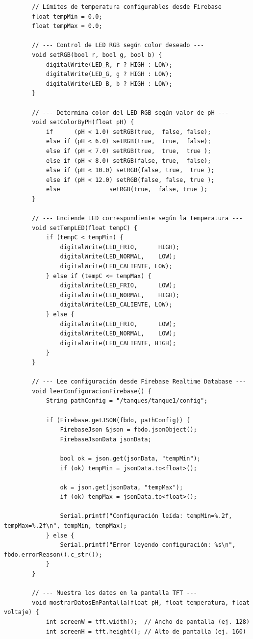 \documentclass[a4paper,12pt]{article}
\begin{document}
\begin{verbatim}
		// Límites de temperatura configurables desde Firebase
		float tempMin = 0.0;
		float tempMax = 0.0;
		
		// --- Control de LED RGB según color deseado ---
		void setRGB(bool r, bool g, bool b) {
			digitalWrite(LED_R, r ? HIGH : LOW);
			digitalWrite(LED_G, g ? HIGH : LOW);
			digitalWrite(LED_B, b ? HIGH : LOW);
		}
		
		// --- Determina color del LED RGB según valor de pH ---
		void setColorByPH(float pH) {
			if      (pH < 1.0) setRGB(true,  false, false);
			else if (pH < 6.0) setRGB(true,  true,  false);
			else if (pH < 7.0) setRGB(true,  true,  true );
			else if (pH < 8.0) setRGB(false, true,  false);
			else if (pH < 10.0) setRGB(false, true,  true );
			else if (pH < 12.0) setRGB(false, false, true );
			else              setRGB(true,  false, true );
		}
		
		// --- Enciende LED correspondiente según la temperatura ---
		void setTempLED(float tempC) {
			if (tempC < tempMin) {
				digitalWrite(LED_FRIO,      HIGH);
				digitalWrite(LED_NORMAL,    LOW);
				digitalWrite(LED_CALIENTE, LOW);
			} else if (tempC <= tempMax) {
				digitalWrite(LED_FRIO,      LOW);
				digitalWrite(LED_NORMAL,    HIGH);
				digitalWrite(LED_CALIENTE, LOW);
			} else {
				digitalWrite(LED_FRIO,      LOW);
				digitalWrite(LED_NORMAL,    LOW);
				digitalWrite(LED_CALIENTE, HIGH);
			}
		}
		
		// --- Lee configuración desde Firebase Realtime Database ---
		void leerConfiguracionFirebase() {
			String pathConfig = "/tanques/tanque1/config";
			
			if (Firebase.getJSON(fbdo, pathConfig)) {
				FirebaseJson &json = fbdo.jsonObject();
				FirebaseJsonData jsonData;
				
				bool ok = json.get(jsonData, "tempMin");
				if (ok) tempMin = jsonData.to<float>();
				
				ok = json.get(jsonData, "tempMax");
				if (ok) tempMax = jsonData.to<float>();
				
				Serial.printf("Configuración leída: tempMin=%.2f, tempMax=%.2f\n", tempMin, tempMax);
			} else {
				Serial.printf("Error leyendo configuración: %s\n", fbdo.errorReason().c_str());
			}
		}
		
		// --- Muestra los datos en la pantalla TFT ---
		void mostrarDatosEnPantalla(float pH, float temperatura, float voltaje) {
			int screenW = tft.width();  // Ancho de pantalla (ej. 128)
			int screenH = tft.height(); // Alto de pantalla (ej. 160)
			

\end{verbatim}
\end{document}
